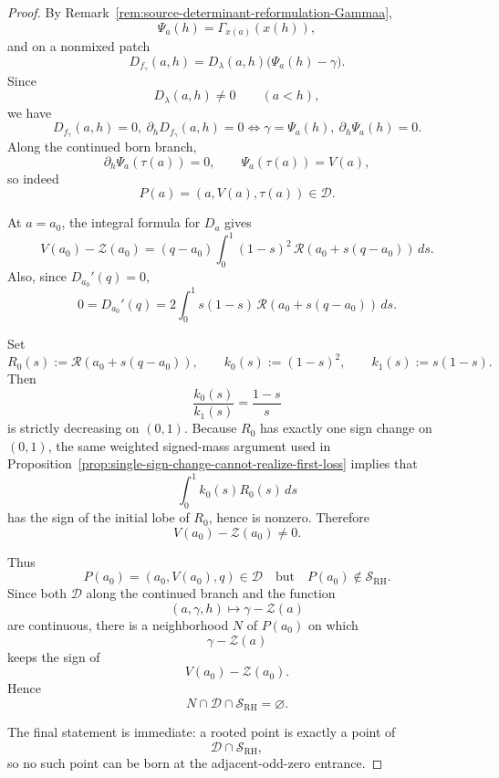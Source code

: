 \documentclass[11pt,a4paper]{amsart}
\theoremstyle{plain}
\theoremstyle{definition}
\begin{document}
\begin{proof}
By Remark~\ref{rem:source-determinant-reformulation-Gammaa},
\[
\Psi_a(h)=\Gamma_{x(a)}(x(h)),
\]
and on a nonmixed patch
\[
D_{f_\gamma}(a,h)=D_\lambda(a,h)\bigl(\Psi_a(h)-\gamma\bigr).
\]
Since
\[
D_\lambda(a,h)\neq 0
\qquad (a<h),
\]
we have
\[
D_{f_\gamma}(a,h)=0,\ \partial_hD_{f_\gamma}(a,h)=0
\iff
\gamma=\Psi_a(h),\ \partial_h\Psi_a(h)=0.
\]
Along the continued born branch,
\[
\partial_h\Psi_a(\tau(a))=0,
\qquad
\Psi_a(\tau(a))=V(a),
\]
so indeed
\[
P(a)=(a,V(a),\tau(a))\in\mathcal D.
\]

At $a=a_0$, the integral formula for $D_a$ gives
\[
V(a_0)-\mathcal Z(a_0)
=
(q-a_0)\int_0^1 (1-s)^2\,
\mathcal R(a_0+s(q-a_0))\,ds.
\]
Also, since $D_{a_0}'(q)=0$,
\[
0
=
D_{a_0}'(q)
=
2\int_0^1 s(1-s)\,
\mathcal R(a_0+s(q-a_0))\,ds.
\]

Set
\[
R_0(s):=\mathcal R(a_0+s(q-a_0)),
\qquad
k_0(s):=(1-s)^2,
\qquad
k_1(s):=s(1-s).
\]
Then
\[
\frac{k_0(s)}{k_1(s)}=\frac{1-s}{s}
\]
is strictly decreasing on $(0,1)$. Because $R_0$ has exactly one sign change on
$(0,1)$, the same weighted signed-mass argument used in
Proposition~\ref{prop:single-sign-change-cannot-realize-first-loss} implies
that
\[
\int_0^1 k_0(s)R_0(s)\,ds
\]
has the sign of the initial lobe of $R_0$, hence is nonzero. Therefore
\[
V(a_0)-\mathcal Z(a_0)\neq 0.
\]

Thus
\[
P(a_0)=(a_0,V(a_0),q)\in\mathcal D
\quad\text{but}\quad
P(a_0)\notin\mathcal S_{\mathrm{RH}}.
\]
Since both $\mathcal D$ along the continued branch and the function
\[
(a,\gamma,h)\longmapsto \gamma-\mathcal Z(a)
\]
are continuous, there is a neighborhood $N$ of $P(a_0)$ on which
\[
\gamma-\mathcal Z(a)
\]
keeps the sign of
\[
V(a_0)-\mathcal Z(a_0).
\]
Hence
\[
N\cap\mathcal D\cap\mathcal S_{\mathrm{RH}}=\varnothing.
\]

The final statement is immediate: a rooted point is exactly a point of
\[
\mathcal D\cap\mathcal S_{\mathrm{RH}},
\]
so no such point can be born at the adjacent-odd-zero entrance.
\end{proof}
\end{document}
